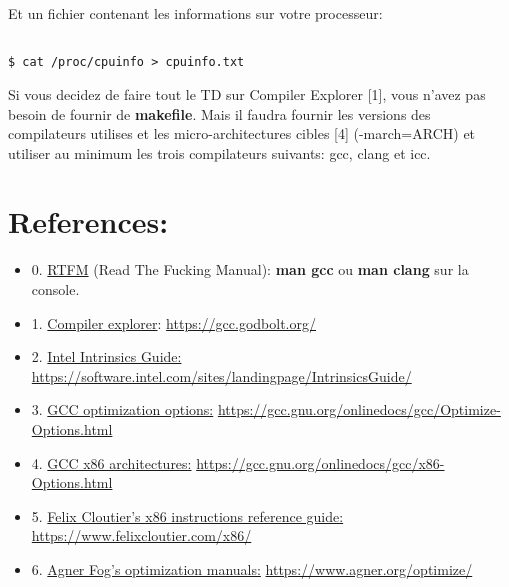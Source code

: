\documentclass[11pt]{article}
\begin{document}
Et un fichier contenant les informations sur votre processeur:

\begin{verbatim}

$ cat /proc/cpuinfo > cpuinfo.txt

\end{verbatim}

Si vous decidez de faire tout le TD sur Compiler Explorer [1], vous n'avez pas besoin de fournir de \textbf{makefile}. Mais il faudra fournir les versions
des compilateurs utilises et les micro-architectures cibles [4] (-march=ARCH) et utiliser au minimum les trois compilateurs suivants: gcc, clang et icc.

\section{References:}
\label{sec:org2b954bc}

\begin{itemize}
\item 0. \uline{RTFM} (Read The Fucking Manual): \textbf{man gcc} ou \textbf{man clang} sur la console.

\item 1. \uline{Compiler explorer}: \url{https://gcc.godbolt.org/}
\item 2. \uline{Intel Intrinsics Guide:} \url{https://software.intel.com/sites/landingpage/IntrinsicsGuide/}
\item 3. \uline{GCC optimization options:} \url{https://gcc.gnu.org/onlinedocs/gcc/Optimize-Options.html}
\item 4. \uline{GCC x86 architectures:} \url{https://gcc.gnu.org/onlinedocs/gcc/x86-Options.html}
\item 5. \uline{Felix Cloutier's x86 instructions reference guide:} \url{https://www.felixcloutier.com/x86/}
\item 6. \uline{Agner Fog's optimization manuals:} \url{https://www.agner.org/optimize/}
\end{itemize}
\end{document}

